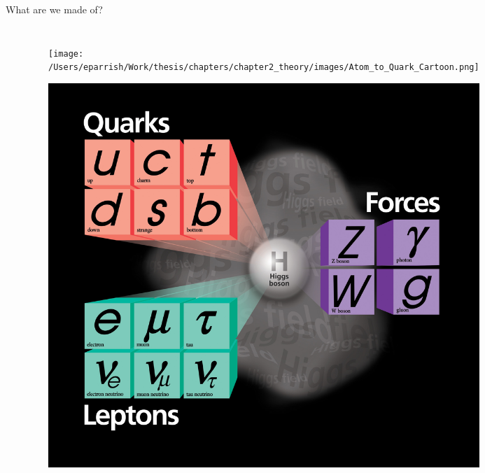 \documentclass[aspectratio=169,xcolor=table]{beamer}
\begin{document}
\begin{frame}[t]{What are we made of?}
\begin{columns}
\begin{itemize}
      \end{itemize}
      \begin{figure}
        \centering
        \texttt{[image: /Users/eparrish/Work/thesis/chapters/chapter2\_theory/images/Atom\_to\_Quark\_Cartoon.png]}
        \caption{\tiny\cite{atom-to-quark} \cite{SM-Diagram}}
        \includegraphics[height=.4\textheight,keepaspectratio=true]{SM High Res.jpeg}
      \end{figure}
    \end{columns}
  \end{frame}

\end{document}
